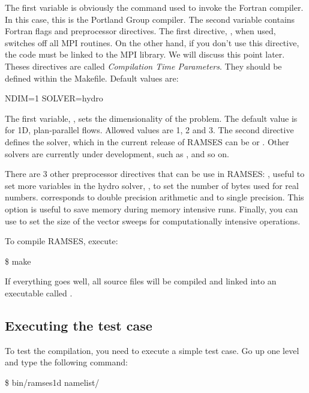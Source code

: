 The first variable is obviously the command used to invoke the Fortran
compiler. In this case, this is the Portland Group compiler. The second
variable contains Fortran flags and preprocessor directives. The first
directive, , when used, switches off all MPI
routines. On the other hand, if you don't use this directive, the code
must be linked to the MPI library. We will discuss this point later.
Theses directives are called \emph{Compilation Time Parameters}.  They
should be defined within the Makefile. Default values are:

\begin{Prompt}
NDIM=1
SOLVER=hydro
\end{Prompt}

The first variable, , sets the dimensionality of the
problem. The default value is for 1D, plan-parallel flows. Allowed
values are 1, 2 and 3. The second directive defines the solver, which in
the current release of RAMSES can be  or .
Other solvers are currently under development, such as ,
 and so on.

There are 3 other preprocessor directives that can be use in RAMSES:
, useful to set more variables in the
hydro solver, , to set the number of bytes used
for real numbers.  corresponds to double precision
arithmetic and  to single precision. This option is useful
to save memory during memory intensive runs. Finally, you can use
 to set the size of the vector sweeps for
computationally intensive operations.

To compile RAMSES, execute:

\begin{Prompt}
\$ make
\end{Prompt}

If everything goes well, all source files will be compiled and linked
into an executable called .

\subsection{Executing the test case}

To test the compilation, you need to execute a simple test case. Go up
one level and type the following command:

\begin{Prompt}
\$ bin/ramses1d namelist/{\nmlfilename}
\end{Prompt}

